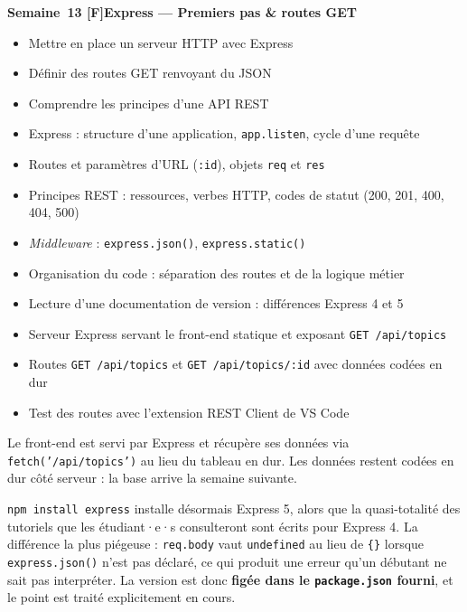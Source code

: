 \documentclass[a4paper,11pt]{article}
\newcommand{\semainetitre}[4]{%
  \needspace{9\baselineskip}%
  \vspace{8pt}
  \noindent
  \begin{tcolorbox}[
    enhanced, colback=cfptBlack, colframe=cfptBlack,
    boxrule=0pt, arc=3pt, boxsep=0pt,
    left=8pt, right=90pt, top=4pt, bottom=4pt,
    overlay={%
      \node[anchor=east, fill=cfptYellow, text=cfptBlack,
            rounded corners=2pt, inner xsep=6pt, inner ysep=3pt,
            font=\scriptsize\bfseries]
        at ([xshift=-6pt]frame.east) {#3};}
  ]
  \color{white}\bfseries\small Semaine~#1 \quad\textcolor{cfptYellow}{[#4]}\quad #2
  \end{tcolorbox}
  \vspace{-4pt}
}
\newcommand{\contenutitre}[1]{%
  \vspace{4pt}
  \noindent{\small\color{accentBlue}\textbf{#1}}\vspace{2pt}
}
\begin{document}
\semainetitre{13}{Express --- Premiers pas \& routes GET}{3h cours / 4h TP}{F}
\begin{tcolorbox}[semaine]
\begin{tcolorbox}[objectifs]
\begin{itemize}
  \item Mettre en place un serveur HTTP avec Express
  \item Définir des routes GET renvoyant du JSON
  \item Comprendre les principes d'une API REST
\end{itemize}
\end{tcolorbox}
\vspace{4pt}
\contenutitre{Cours}
\begin{itemize}
  \item Express : structure d'une application, \texttt{app.listen}, cycle d'une requête
  \item Routes et paramètres d'URL (\texttt{:id}), objets \texttt{req} et \texttt{res}
  \item Principes REST : ressources, verbes HTTP, codes de statut (200, 201, 400, 404, 500)
  \item \textit{Middleware} : \texttt{express.json()}, \texttt{express.static()}
  \item Organisation du code : séparation des routes et de la logique métier
  \item Lecture d'une documentation de version : différences Express 4 et 5
\end{itemize}
\contenutitre{Travaux pratiques}
\begin{itemize}
  \item Serveur Express servant le front-end statique et exposant \texttt{GET /api/topics}
  \item Routes \texttt{GET /api/topics} et \texttt{GET /api/topics/:id} avec données codées en dur
  \item Test des routes avec l'extension REST Client de VS Code
\end{itemize}
\end{tcolorbox}
\begin{tcolorbox}[filrouge={Le serveur du MiniForum démarre}]
\small Le front-end est servi par Express et récupère ses données via \texttt{fetch('/api/topics')} au lieu du tableau en dur. Les données restent codées en dur côté serveur : la base arrive la semaine suivante.
\end{tcolorbox}

\begin{tcolorbox}[alerte, title={Express 5 et les tutoriels en ligne}]
\small
\texttt{npm install express} installe désormais Express 5, alors que la quasi-totalité des tutoriels que les étudiant·e·s consulteront sont écrits pour Express 4. La différence la plus piégeuse : \texttt{req.body} vaut \texttt{undefined} au lieu de \texttt{\{\}} lorsque \texttt{express.json()} n'est pas déclaré, ce qui produit une erreur qu'un débutant ne sait pas interpréter. La version est donc \textbf{figée dans le \texttt{package.json} fourni}, et le point est traité explicitement en cours.
\end{tcolorbox}
\end{document}
